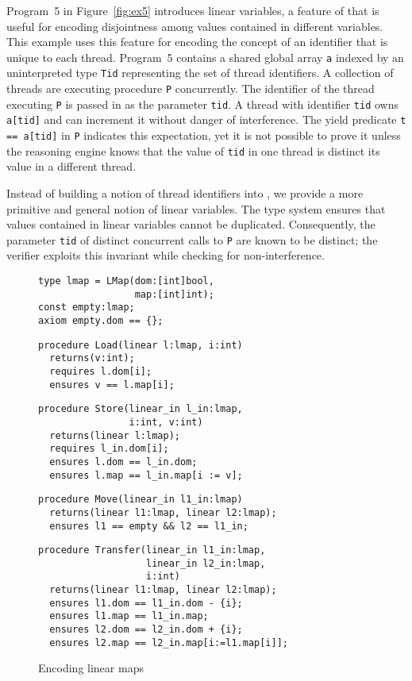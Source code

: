 Program~5 in Figure~\ref{fig:ex5} introduces linear variables, a feature of \civl 
that is useful for encoding disjointness among values contained in 
different variables.  
This example uses this feature for encoding the concept of an identifier 
that is unique to each thread.
Program~5 contains a shared global array {\tt a} indexed by an uninterpreted type {\tt Tid} 
representing the set of thread identifiers.
A collection of threads are executing procedure {\tt P} concurrently.
The identifier of the thread executing {\tt P} is passed in as the parameter {\tt tid}.
A thread with identifier {\tt tid} owns {\tt a[tid]} and can increment it without danger of interference.
The yield predicate {\tt t == a[tid]} in {\tt P} indicates this expectation, yet it is not possible to prove it 
unless the reasoning engine knows that the value of {\tt tid} in one thread is distinct 
its value in a different thread.

Instead of building a notion of thread identifiers into \civl, we provide a more 
primitive and general notion of linear variables.
The \civl type system ensures that values contained in linear variables cannot be duplicated.
Consequently, the parameter {\tt tid} of distinct concurrent calls to {\tt P} are known to be distinct;
the \civl verifier exploits this invariant while checking for non-interference.

\begin{figure}
\begin{verbatim}
type lmap = LMap(dom:[int]bool,
                 map:[int]int);
const empty:lmap;
axiom empty.dom == {};
\end{verbatim}
\begin{verbatim}
procedure Load(linear l:lmap, i:int) 
  returns(v:int);
  requires l.dom[i];
  ensures v == l.map[i];
\end{verbatim}
\begin{verbatim}
procedure Store(linear_in l_in:lmap,
                i:int, v:int) 
  returns(linear l:lmap);
  requires l_in.dom[i];
  ensures l.dom == l_in.dom;
  ensures l.map == l_in.map[i := v];
\end{verbatim}
\begin{verbatim}
procedure Move(linear_in l1_in:lmap) 
  returns(linear l1:lmap, linear l2:lmap);
  ensures l1 == empty && l2 == l1_in;
\end{verbatim}
\begin{verbatim}
procedure Transfer(linear_in l1_in:lmap, 
                   linear_in l2_in:lmap,
                   i:int) 
  returns(linear l1:lmap, linear l2:lmap);
  ensures l1.dom == l1_in.dom - {i};
  ensures l1.map == l1_in.map;
  ensures l2.dom == l2_in.dom + {i};
  ensures l2.map == l2_in.map[i:=l1.map[i]];
\end{verbatim}
\caption{Encoding linear maps}
\label{fig:linear-maps}
\end{figure}

